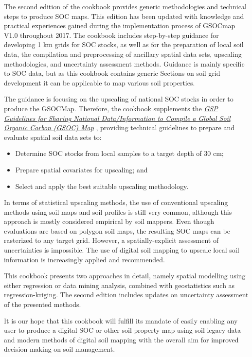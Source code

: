 \documentclass[10pt,b5paper,]{book}
\providecommand{\tightlist}{%
  \setlength{\itemsep}{0pt}\setlength{\parskip}{0pt}}
\theoremstyle{definition}
\theoremstyle{definition}
\theoremstyle{definition}
\theoremstyle{remark}
\begin{document}
The second edition of the cookbook provides generic methodologies and
technical steps to produce SOC maps. This edition has been updated with
knowledge and practical experiences gained during the implementation
process of GSOCmap V1.0 throughout 2017. The cookbook includes
step-by-step guidance for developing 1 km grids for SOC stocks, as well
as for the preparation of local soil data, the compilation and
preprocessing of ancillary spatial data sets, upscaling methodologies,
and uncertainty assessment methods. Guidance is mainly specific to SOC
data, but as this cookbook contains generic Sections on soil grid
development it can be applicable to map various soil properties.

The guidance is focusing on the upscaling of national SOC stocks in
order to produce the GSOCMap. Therefore, the cookbook supplements the
\href{http://www.fao.org/3/a-bp164e.pdf}{\emph{GSP Guidelines for
Sharing National Data/Information to Compile a Global Soil Organic
Carbon (GSOC) Map}} \citep{gsp_guidelines_2017}, providing technical
guidelines to prepare and evaluate spatial soil data sets to:

\begin{itemize}
\tightlist
\item
  Determine SOC stocks from local samples to a target depth of 30 cm;
\item
  Prepare spatial covariates for upscaling; and
\item
  Select and apply the best suitable upscaling methodology.
\end{itemize}

In terms of statistical upscaling methods, the use of conventional
upscaling methods using soil maps and soil profiles is still very
common, although this approach is mostly considered empirical by soil
mappers. Even though evaluations are based on polygon soil maps, the
resulting SOC maps can be rasterized to any target grid. However, a
spatially-explicit assessment of uncertainties is impossible. The use of
digital soil mapping to upscale local soil information is increasingly
applied and recommended.

This cookbook presents two approaches in detail, namely spatial
modelling using either regression or data mining analysis, combined with
geostatistics such as regression-kriging. The second edition includes
updates on uncertainty assessment of the presented methods.

It is our hope that this cookbook will fulfill its mandate of easily
enabling any user to produce a digital SOC or other soil property map
using soil legacy data and modern methods of digital soil mapping with
the overall aim for improved decision making on soil management.
\end{document}
